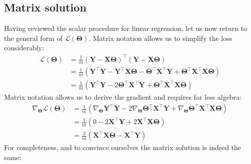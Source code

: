 \documentclass[12pt,initial,twoside,maitrise]{dms}
\numberwithin{equation}{section}
\numberwithin{table}{chapter}
\numberwithin{figure}{chapter}
\begin{document}
\subsection{Matrix solution}

Having reviewed the scalar procedure for linear regression, let us now return to the general form of $\mathcal L(\bm\Theta)$. Matrix notation allows us to simplify the loss considerably:
%
\begin{align}
\mathcal L(\bm\Theta) & = \frac{1}{m} (\mathbf Y - \mathbf X \bm\Theta)^\intercal(\mathbf Y - \mathbf X \bm\Theta) \\ &= \frac{1}{m} (\mathbf Y^\intercal \mathbf Y - \mathbf Y^\intercal \mathbf X \bm\Theta - \bm\Theta^\intercal \mathbf X^\intercal \mathbf Y + \bm\Theta^\intercal \mathbf X^\intercal \mathbf X \bm\Theta) \\ &= \frac{1}{m} (\mathbf Y^\intercal \mathbf Y - 2 \bm\Theta^\intercal \mathbf X^\intercal \mathbf Y + \bm\Theta^\intercal \mathbf X^\intercal \mathbf X \bm\Theta)
\end{align}
%
Matrix notation allows us to derive the gradient and requires far less algebra:
%
\begin{align}
\nabla_{\bm\Theta}\mathcal L(\bm\Theta) & = \frac{1}{m} (\nabla_{\bm\Theta}\mathbf Y^\intercal \mathbf Y - 2 \nabla_{\bm\Theta} \bm\Theta^\intercal \mathbf X^\intercal \mathbf Y + \nabla_{\bm\Theta}\bm\Theta^\intercal \mathbf X^\intercal \mathbf X \bm\Theta) \\ & = \frac{1}{m} ( 0 - 2\mathbf{X}^\intercal \mathbf Y + 2 \mathbf{X}^\intercal \mathbf X \bm\Theta ) \\ & = \boxed{\frac{2}{m} (\mathbf{X}^\intercal \mathbf X \bm\Theta - \mathbf{X}^\intercal \mathbf Y)}
\end{align}
%
For completeness, and to convince ourselves the matrix solution is indeed the same:
%
\end{document}
